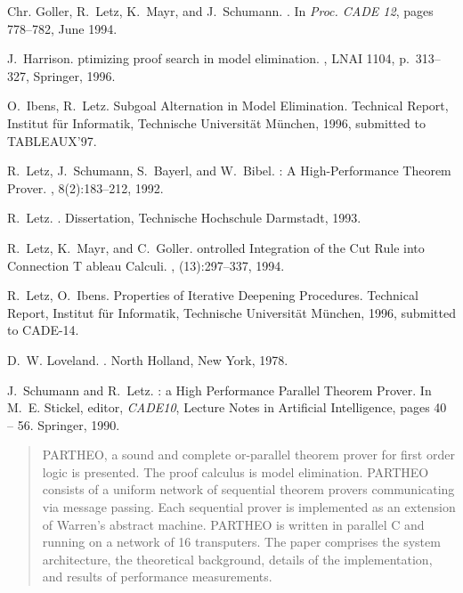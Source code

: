 \begin{thebibliography}{}

Chr. Goller, R.~Letz, K.~Mayr, and J.~Schumann.
.
\newblock In {\em Proc. CADE 12}, pages 778--782, June 1994.

J.~Harrison.
ptimizing proof search in model elimination.
, LNAI 1104, p.~313--327, Springer, 1996.

O.\ Ibens, R.\ Letz.
\newblock Subgoal Alternation in Model Elimination.
\newblock Technical Report, Institut f{\"u}r Informatik, Technische
  Universit{\"a}t M{\"u}nchen, 1996, submitted to TABLEAUX'97.

R.~Letz, J.~Schumann, S.~Bayerl, and W.~Bibel.
: {A} {H}igh-{P}erformance {T}heorem {P}rover.
, 8(2):183--212, 1992.

R.~Letz.
.
\newblock Dissertation, Technische Hochschule Darmstadt, 1993.

R.~Letz, K.~Mayr, and C.~Goller.
ontrolled {I}ntegration of the {C}ut {R}ule into {C}onnection {T}
  ableau {C}alculi.
, (13):297--337, 1994.

R.\ Letz, O.\ Ibens.
\newblock Properties of Iterative Deepening Procedures.
\newblock Technical Report, Institut f{\"u}r Informatik, Technische
  Universit{\"a}t M{\"u}nchen, 1996, submitted to CADE-14.

D.~W. Loveland.
.
\newblock North Holland, New York, 1978.

J.~Schumann and R.~Letz.
: a {H}igh {P}erformance {P}arallel {T}heorem {P}rover.
\newblock In M.~E. Stickel, editor, {\em CADE10}, Lecture Notes in Artificial
  Intelligence, pages 40 -- 56. Springer, 1990.
\begin{quotation}
{\small PARTHEO}, a sound and complete or-parallel theorem prover for first order
logic is presented. The proof calculus is model elimination.
{\small PARTHEO} consists of a uniform network of
sequential theorem provers communicating via message
passing. Each sequential prover is implemented as an
extension of Warren's abstract machine.
{\small PARTHEO} is written in parallel C and running on a network of 16
transputers.
The paper comprises the system architecture, the theoretical background,
details of the implementation,
and results of performance measurements.
\end{quotation}


\end{thebibliography}
